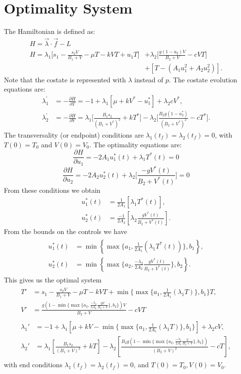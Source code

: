 \section*{Optimality System}
The Hamiltonian is defined as:
\begin{align*}
	H = \vec{\lambda} \cdot \vec{f} - L\\
	H =\lambda_1\Big[ s_1 - \frac{s_2V}{B_1+V}-\mu T-kVT+u_1T \Big] &+ \lambda_2 \Big[\frac{g(1-u_2)V}{B_2+V}-cVT\Big]\\
	 &+  [T-(A_1u_1^2+A_2u_2^2)].
\end{align*}
Note that the costate is represented with $\lambda$ instead of $p$.
The costate evolution equations are:
\begin{align*}
	\lambda_1^{'} &=-\frac{\partial H}{\partial T} =  -1+\lambda_1[\mu+kV^*-u_1^*]+\lambda_2cV^*,\\
	\lambda_2^{'} &= -\frac{\partial H}{\partial V} = \lambda_1\Big[\frac{B_1s_2}{(B_1+V^*)^2}+kT^*\Big] -\lambda_2\Big[\frac{B_2g(1-u_2^*)}				{(B_2+V^*)^2}-cT^*\Big].
\end{align*}
The transversality (or endpoint) conditions are $\lambda_1(t_f)=\lambda_2(t_f)=0$, with $T(0)=T_0$ and $V(0)=V_0$. 
The optimality equations are:
$$\frac{\partial H}{\partial u_1} = -2A_1u_1^*(t)+\lambda_1T^*(t)=0$$
$$\frac{\partial H}{\partial u_2} = -2A_2u_2^*(t)+\lambda_2\big[\frac{-gV^*(t)}{B_2+V^*(t)}\big]=0$$
From these conditions we obtain
\begin{align*}
	u_1^*(t) &= \frac{1}{2A_1}\left[\lambda_1T^*(t)\right],\\
	u_2^*(t) &= \frac{-1}{2A_2}\left[\lambda_2\frac{gV^*(t)}{B_2+V^*(t)}\right].
\end{align*}
From the bounds on the controls we have
\begin{align*}
	\begin{split}
		u_1^*(t)&=\min\left\{\max\{a_1,\frac{1}{2A_1}(\lambda_1T^*(t))\},b_1\right\},\\
		u_2^*(t)&=\min\left\{\max\{a_2,\frac{-\lambda_2}{2A_2}\frac{gV^*(t)}{B_2+V^*(t)}\},b_2\right\}.
	\end{split}
\end{align*}
This gives us the optimal system
\begin{align}
	\begin{split}
		T'&=s_1-\frac{s_2V}{B_1+V}-\mu T-kVT+\min\{\max\{a_1,\frac{1}{2A_1}(\lambda_1T)\},b_1\}T,\\
		V'&=\frac{g(1-\min\{\max\{a_2,\frac{-\lambda_2}{2A_2}\frac{gV}{B_2+V}\},b_2\})V}{B_2+V}-cVT
	\end{split} \label{modified_state:HIV}\\
	\begin{split}
		\lambda_1'&=-1+\lambda_1\left[\mu+kV-\min\{\max\{a_1,\frac{1}{2A_1}(\lambda_1T)\},b_1\}\right]+\lambda_2cV,\\
		\lambda_2'&=\lambda_1\left[\frac{B_1s_2}{(B_1+V)^2}+kT\right]-\lambda_2\left[\frac{B_2g(1-\min\{\max\{a_2,\frac{-\lambda_2}{2A_2}\frac{V}			{B_2+V}\},b_2\})}{(B_2+V)^2}-cT\right],
	\end{split}
\end{align}
with end conditions $\lambda_1(t_f)=\lambda_2(t_f)=0$, and $T(0)=T_0,V(0)=V_0$.

